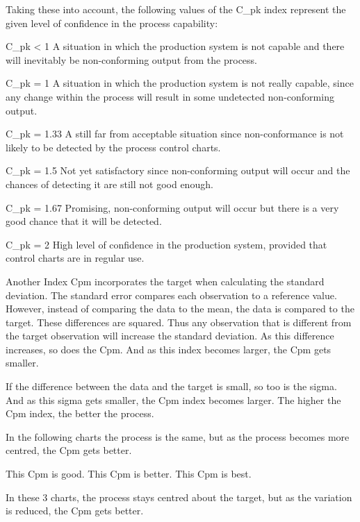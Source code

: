 Taking these into account, the following values of the C_{pk} index represent the given level of confidence in the process capability:

\item	C_{pk} < 1 A situation in which the production system is not capable and there will inevitably be non-conforming output from the process.

\item	C_{pk} = 1 A situation in which the production system is not really capable, since any change within the process will result in some undetected non-conforming output.

\item	C_{pk} = 1.33 A still far from acceptable situation since non-conformance is not likely to be detected by the process control charts.

\item	C_{pk} = 1.5 Not yet satisfactory since non-conforming output will occur and the chances of detecting it are still not good enough.

\item	C_{pk} = 1.67 Promising, non-conforming output will occur but there is a very good chance that it will be detected.

\item	C_{pk} = 2 High level of confidence in the production system, provided that control charts are in regular use.

Another Index Cpm incorporates the target when calculating the standard deviation. The standard error  compares each observation to a reference value. However, instead of comparing the data to the mean, the data is compared to the target. These differences are squared. Thus any observation that is different from the target observation will increase the   standard deviation.
As this difference increases, so does the Cpm. And as this index becomes larger, the Cpm gets smaller. 

If the difference between the data and the target is small, so too is the sigma. And as this sigma gets smaller, the Cpm index becomes larger. The higher the Cpm index, the better the process.

In the following charts the process is the same, but as the process becomes more centred, the Cpm gets better.

	 	This Cpm is good.
	 	This Cpm is better.
	 	This Cpm is best.


In these 3 charts, the process stays centred about the target, but as the variation is reduced, the Cpm gets better.

